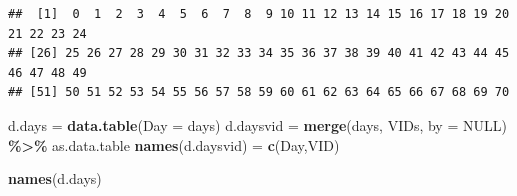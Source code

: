 \documentclass[
]{book}
\newenvironment{Shaded}{\begin{snugshade}}{\end{snugshade}}
\newcommand{\AttributeTok}[1]{\textcolor[rgb]{0.13,0.29,0.53}{#1}}
\newcommand{\ConstantTok}[1]{\textcolor[rgb]{0.56,0.35,0.01}{#1}}
\newcommand{\DecValTok}[1]{\textcolor[rgb]{0.00,0.00,0.81}{#1}}
\newcommand{\DocumentationTok}[1]{\textcolor[rgb]{0.56,0.35,0.01}{\textbf{\textit{#1}}}}
\newcommand{\FunctionTok}[1]{\textcolor[rgb]{0.13,0.29,0.53}{\textbf{#1}}}
\newcommand{\NormalTok}[1]{#1}
\newcommand{\OtherTok}[1]{\textcolor[rgb]{0.56,0.35,0.01}{#1}}
\newcommand{\SpecialCharTok}[1]{\textcolor[rgb]{0.81,0.36,0.00}{\textbf{#1}}}
\newcommand{\StringTok}[1]{\textcolor[rgb]{0.31,0.60,0.02}{#1}}
\begin{document}
\begin{Shaded}
\end{Shaded}

\begin{verbatim}
##  [1]  0  1  2  3  4  5  6  7  8  9 10 11 12 13 14 15 16 17 18 19 20 21 22 23 24
## [26] 25 26 27 28 29 30 31 32 33 34 35 36 37 38 39 40 41 42 43 44 45 46 47 48 49
## [51] 50 51 52 53 54 55 56 57 58 59 60 61 62 63 64 65 66 67 68 69 70
\end{verbatim}

\begin{Shaded}
\begin{Highlighting}[]
\NormalTok{d.days }\OtherTok{=} \FunctionTok{data.table}\NormalTok{(}\AttributeTok{Day =}\NormalTok{ days)}
\NormalTok{d.daysvid }\OtherTok{=} \FunctionTok{merge}\NormalTok{(days, VIDs, }\AttributeTok{by =} \ConstantTok{NULL}\NormalTok{) }\SpecialCharTok{\%\textgreater{}\%} 
\NormalTok{  as.data.table}
\FunctionTok{names}\NormalTok{(d.daysvid) }\OtherTok{=} \FunctionTok{c}\NormalTok{(}\StringTok{\textquotesingle{}Day\textquotesingle{}}\NormalTok{,}\StringTok{\textquotesingle{}VID\textquotesingle{}}\NormalTok{)}

\FunctionTok{names}\NormalTok{(d.days)}
\end{Highlighting}
\end{Shaded}
\end{document}
